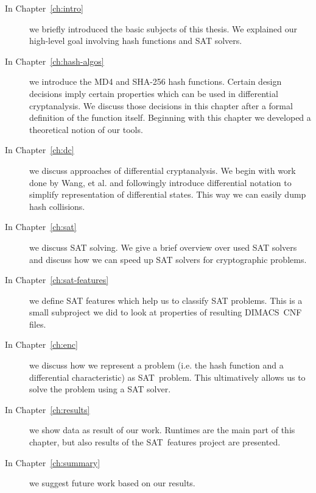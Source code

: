 \begin{description}
\item[In Chapter~\ref{ch:intro}] we briefly introduced the basic subjects of this
  thesis. We explained our high-level goal involving hash functions and SAT solvers.

\item[In Chapter~\ref{ch:hash-algos}] we introduce the MD4 and SHA-256 hash functions.
  Certain design decisions imply certain properties which can be used in differential
  cryptanalysis. We discuss those decisions in this chapter after a formal definition
  of the function itself. Beginning with this chapter we developed a theoretical notion
  of our tools.

\item[In Chapter~\ref{ch:dc}] we discuss approaches of differential cryptanalysis.
  We begin with work done by Wang, et al. and followingly introduce differential notation
  to simplify representation of differential states. This way we can easily dump
  hash collisions.

\item[In Chapter~\ref{ch:sat}] we discuss SAT solving. We give a brief overview
  over used SAT solvers and discuss how we can speed up SAT solvers for cryptographic
  problems.

\item[In Chapter~\ref{ch:sat-features}] we define SAT features which help us to
  classify SAT problems. This is a small subproject we did to look at properties
  of resulting DIMACS~CNF files.

\item[In Chapter~\ref{ch:enc}] we discuss how we represent a problem (i.e. the hash
  function and a differential characteristic) as SAT~problem. This ultimatively
  allows us to solve the problem using a SAT solver.

\item[In Chapter~\ref{ch:results}] we show data as result of our work.
  Runtimes are the main part of this chapter, but also results of the SAT~features
  project are presented.

\item[In Chapter~\ref{ch:summary}] we suggest future work based on our results.
\end{description}
